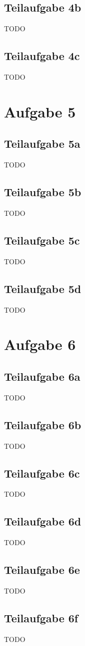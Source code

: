 \documentclass[a4paper]{scrartcl}
\begin{document}
\subsection*{Teilaufgabe 4b}
TODO
\subsection*{Teilaufgabe 4c}
TODO

\section*{Aufgabe 5}
\subsection*{Teilaufgabe 5a}
TODO
\subsection*{Teilaufgabe 5b}
TODO
\subsection*{Teilaufgabe 5c}
TODO
\subsection*{Teilaufgabe 5d}
TODO

\section*{Aufgabe 6}
\subsection*{Teilaufgabe 6a}
TODO
\subsection*{Teilaufgabe 6b}
TODO
\subsection*{Teilaufgabe 6c}
TODO
\subsection*{Teilaufgabe 6d}
TODO
\subsection*{Teilaufgabe 6e}
TODO
\subsection*{Teilaufgabe 6f}
TODO
\end{document}
